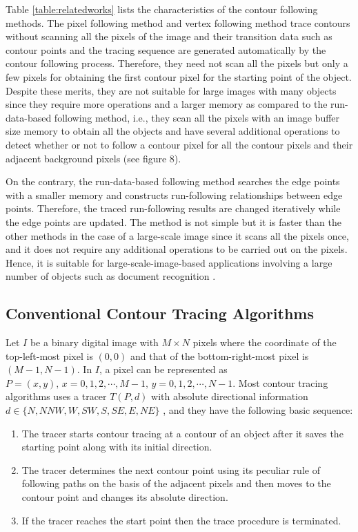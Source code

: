 Table \ref{table:relatedworks} lists the characteristics of the contour following methods. The pixel following method and vertex following method trace contours without scanning all the pixels of the image and their transition data such as contour points and the tracing sequence are generated automatically by the contour following process. Therefore, they need not scan all the pixels but only a few pixels for obtaining the first contour pixel for the starting point of the object. Despite these merits, they are not suitable for large images with many objects since they require more operations and a larger memory as compared to the run-data-based following method, i.e., they scan all the pixels with an image buffer size memory to obtain all the objects and have several additional operations to detect whether or not to follow a contour pixel for all the contour pixels and their adjacent background pixels (see figure 8). 

On the contrary, the run-data-based following method searches the edge points with a smaller memory and constructs run-following relationships between edge points. Therefore, the traced run-following results are changed iteratively while the edge points are updated. The method is not simple but it is faster than the other methods in the case of a large-scale image since it scans all the pixels once, and it does not require any additional operations to be carried out on the pixels. Hence, it is suitable for large-scale-image-based applications involving a large number of objects such as document recognition \cite{Miyatake1997Contour}.

\subsection{Conventional Contour Tracing Algorithms}

Let $I$ be a binary digital image with $M \times N$ pixels where the coordinate of the top-left-most pixel is $(0, 0)$ and that of the bottom-right-most pixel is $(M-1, N-1)$. In $I$, a pixel can be represented as $P = (x, y),\, x = 0,1,2,\cdots,M-1,\, y = 0,1,2,\cdots, N-1$. Most contour tracing algorithms uses a tracer $T (P, d)$ with absolute directional information $d\in\{N,NNW,W,SW,S,SE,E,NE\}$ , and they have the following basic sequence: 
\begin{enumerate}
\item The tracer starts contour tracing at a contour of an object after it saves the starting point along with its initial direction. 
\item The tracer determines the next contour point using its peculiar rule of following paths on the basis of the adjacent pixels and then moves to the contour point and changes its absolute direction. 
\item If the tracer reaches the start point then the trace procedure is terminated. 
\end{enumerate}

